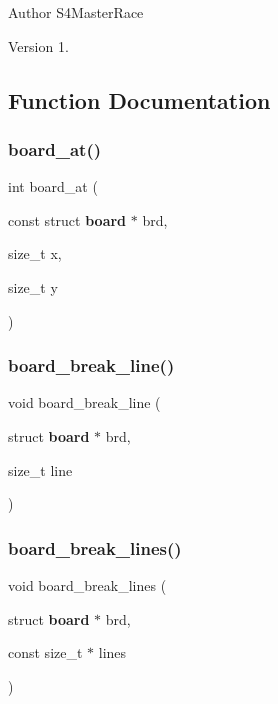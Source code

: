 \begin{DoxyAuthor}{Author}
S4\+Master\+Race 
\end{DoxyAuthor}
\begin{DoxyVersion}{Version}
1. 
\end{DoxyVersion}


\subsection{Function Documentation}
\mbox{\label{board_8c_af9d59403454f43dc13caa724554dce78}} 
\subsubsection{board\+\_\+at()}
{\footnotesize\ttfamily int board\+\_\+at (\begin{DoxyParamCaption}\item[{const struct \textbf{ board} $\ast$}]{brd,  }\item[{size\+\_\+t}]{x,  }\item[{size\+\_\+t}]{y }\end{DoxyParamCaption})\hspace{0.3cm}{\ttfamily [inline]}}

\mbox{\label{board_8c_a273970b38366ac7968ad05805c9674ad}} 
\subsubsection{board\+\_\+break\+\_\+line()}
{\footnotesize\ttfamily void board\+\_\+break\+\_\+line (\begin{DoxyParamCaption}\item[{struct \textbf{ board} $\ast$}]{brd,  }\item[{size\+\_\+t}]{line }\end{DoxyParamCaption})\hspace{0.3cm}{\ttfamily [inline]}}

\mbox{\label{board_8c_afa8d5a563ecd52ae02e10cbb645c3782}} 
\subsubsection{board\+\_\+break\+\_\+lines()}
{\footnotesize\ttfamily void board\+\_\+break\+\_\+lines (\begin{DoxyParamCaption}\item[{struct \textbf{ board} $\ast$}]{brd,  }\item[{const size\+\_\+t $\ast$}]{lines }\end{DoxyParamCaption})\hspace{0.3cm}{\ttfamily [inline]}}

